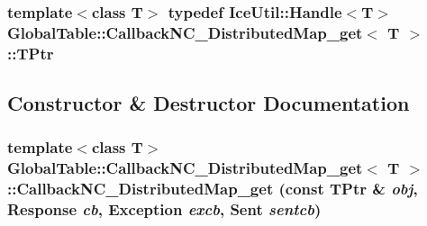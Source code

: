 \hypertarget{class_global_table_1_1_callback_n_c___distributed_map__get_a292c63a092a90c360da327d6157fb137}{
\subsubsection[{TPtr}]{\setlength{\rightskip}{0pt plus 5cm}template$<$class T$>$ typedef IceUtil::Handle$<$T$>$ {\bf GlobalTable::CallbackNC\_\-DistributedMap\_\-get}$<$ T $>$::{\bf TPtr}}}
\label{class_global_table_1_1_callback_n_c___distributed_map__get_a292c63a092a90c360da327d6157fb137}


\subsection{Constructor \& Destructor Documentation}
\hypertarget{class_global_table_1_1_callback_n_c___distributed_map__get_a09d91d4925eca625514499fd0e8b9c0e}{
\subsubsection[{CallbackNC\_\-DistributedMap\_\-get}]{\setlength{\rightskip}{0pt plus 5cm}template$<$class T$>$ {\bf GlobalTable::CallbackNC\_\-DistributedMap\_\-get}$<$ T $>$::{\bf CallbackNC\_\-DistributedMap\_\-get} (const {\bf TPtr} \& {\em obj}, \/  {\bf Response} {\em cb}, \/  {\bf Exception} {\em excb}, \/  {\bf Sent} {\em sentcb})}}
\label{class_global_table_1_1_callback_n_c___distributed_map__get_a09d91d4925eca625514499fd0e8b9c0e}


